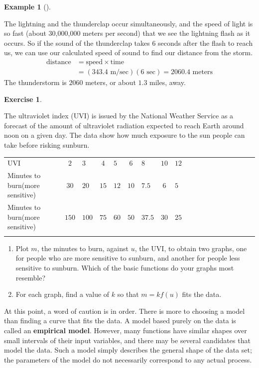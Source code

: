 \documentclass[10pt,]{book}
\newcommand{\terminology}[1]{\textbf{#1}}
\theoremstyle{plain}
\theoremstyle{definition}
\theoremstyle{definition}
\theoremstyle{definition}
\newtheorem{example}[theorem]{Example}
\theoremstyle{definition}
\theoremstyle{definition}
\newtheorem{exercise}[theorem]{Exercise}
\numberwithin{equation}{section}
\newcommand{\hrulethin}  {\noalign{\hrule height 0.04em}}
\newcommand{\hrulethick} {\noalign{\hrule height 0.11em}}
\newcommand{\amp}{ & }
\begin{document}
\begin{example}[]
\begin{enumerate}[label=*\alph**]
                The lightning and the thunderclap occur simultaneously, and the speed of light is so fast (about 30,000,000 meters per second) that we see the lightning flash as it occurs. So if the sound of the thunderclap takes \(6\) seconds after the flash to reach us, we can use our calculated speed of sound to find our distance from the storm. 
                \begin{align}
                \text{distance} \amp= \text{speed} \times \text{time} \\
                \amp = (343.4\text{  m/sec}) (6 \text{ sec}) = 2060.4 \text{ meters}
                \end{align}
                The thunderstorm is \(2060\) meters, or about \(1.3\) miles, away.
\end{enumerate}
\end{example}
\begin{exercise}\label{exercise-UVI}

    The ultraviolet index (UVI) is issued by the National Weather Service as a forecast of the amount of ultraviolet radiation expected to reach Earth around noon on a given day. The data show how much exposure to the sun people can take before risking sunburn.
    \leavevmode%
\begin{table}
\centering
\begin{tabular}{AcAcAcAcAcAcAcAcAcA}\hrulethick
UVI%
&\(2\)&\(3\)&\(4\)&\(5\)&\(6\)&\(8\)&\(10\)&\(12\)\tabularnewline\hrulethin
Minutes to burn(more sensitive)%
&\(30\)&\(20\)&\(15\)&\(12\)&\(10\)&\(7.5\)&\(6\)&\(5\)\tabularnewline\hrulethin
Minutes to burn(more sensitive)%
&\(150\)&\(100\)&\(75\)&\(60\)&\(50\)&\(37.5\)&\(30\)&\(25\)\tabularnewline\hrulethin
\end{tabular}
\end{table}
\leavevmode%
\begin{enumerate}[label=*\alph**]
\item\hypertarget{li-333}{}Plot \(m\), the minutes to burn, against \(u\), the UVI, to obtain two graphs, one for people who are more sensitive to sunburn, and another for people less sensitive to sunburn. Which of the basic functions do your graphs most resemble?\item\hypertarget{li-334}{}For each graph, find a value of \(k\) so that \(m = k f(u)\) fits the data.\end{enumerate}
\end{exercise}
\par

    At this point, a word of caution is in order. There is more to choosing a model than finding a curve that fits the data. A model based purely on the data is called an \terminology{empirical model}. However, many functions have similar shapes over small intervals of their input variables, and there may be several candidates that model the data. Such a model simply describes the general shape of the data set; the parameters of the model do not necessarily correspond to any actual process.
%
\par
\end{document}
